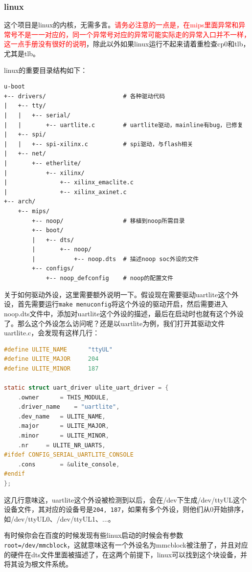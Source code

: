 \documentclass[lang=cn,11pt,a4paper]{elegantpaper}
\begin{document}
\subsubsection{linux}

这个项目是linux的内核，无需多言。\textcolor{red}{请务必注意的一点是，在mips里面异常和异常号不是一一对应的，同一个异常号对应的异常可能实际走的异常入口并不一样，这一点手册没有很好的说明}，除此以外如果linux运行不起来请着重检查cp0和tlb，尤其是tlb。

linux的重要目录结构如下：
\begin{lstlisting}
u-boot
+-- drivers/                      # 各种驱动代码
|   +-- tty/
|   |   +-- serial/
|   |       +-- uartlite.c        # uartlite驱动，mainline有bug，已修复
|   +-- spi/
|   |   +-- spi-xilinx.c          # spi驱动，与flash相关
|   +-- net/
|       +-- etherlite/
|           +-- xilinx/
|               +-- xilinx_emaclite.c
|               +-- xilinx_axinet.c
+-- arch/
    +-- mips/
        +-- noop/                 # 移植到noop所需目录
        +-- boot/
        |   +-- dts/
        |       +-- noop/
        |           +-- noop.dts  # 描述noop soc外设的文件
        +-- configs/
            +-- noop_defconfig    # noop的配置文件
\end{lstlisting}

关于如何驱动外设，这里需要额外说明一下。假设现在需要驱动uartlite这个外设，首先需要运行\lstinline$make menuconfig$将这个外设的驱动开启，然后需要进入noop.dts文件中，添加对uartlite这个外设的描述，最后在启动时也就有这个外设了。那么这个外设怎么访问呢？还是以uartlite为例，我们打开其驱动文件uartlite.c，会发现有这样几行：
\begin{lstlisting}[language=c]
#define ULITE_NAME		"ttyUL"
#define ULITE_MAJOR		204
#define ULITE_MINOR		187

static struct uart_driver ulite_uart_driver = {
	.owner		= THIS_MODULE,
	.driver_name	= "uartlite",
	.dev_name	= ULITE_NAME,
	.major		= ULITE_MAJOR,
	.minor		= ULITE_MINOR,
	.nr		= ULITE_NR_UARTS,
#ifdef CONFIG_SERIAL_UARTLITE_CONSOLE
	.cons		= &ulite_console,
#endif
};
\end{lstlisting}

这几行意味这，uartlite这个外设被检测到以后，会在/dev下生成/dev/ttyUL这个设备文件，其对应的设备号是\lstinline!204, 187!，如果有多个外设，则他们从0开始排序，如/dev/ttyUL0、/dev/ttyUL1、...。

有时候你会在百度的时候发现有些linux启动的时候会有参数\lstinline!root=/dev/mmcblock!，这就意味这有一个外设名为mmcblock被注册了，并且对应的硬件在dts文件里面被描述了，在这两个前提下，linux可以找到这个块设备，并将其设为根文件系统。
\end{document}
